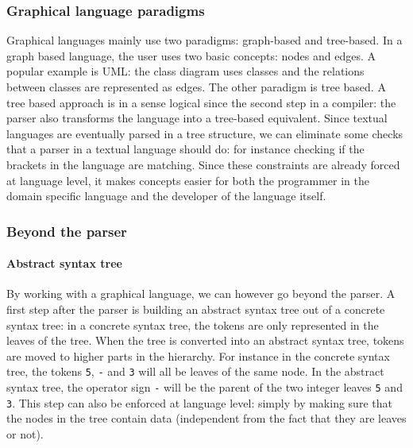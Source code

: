 \subsubsection{Graphical language paradigms}
Graphical languages mainly use two paradigms: graph-based and tree-based. In a
graph based language, the user uses two basic concepts: nodes and edges. A
popular example is UML: the class diagram uses classes and the relations
between classes are represented as edges. The other paradigm is tree based. A
tree based approach is in a sense logical since the second step in a compiler:
the parser also transforms the language into a tree-based equivalent. Since
textual languages are eventually parsed in a tree structure, we can eliminate
some checks that a parser in a textual language should do: for instance
checking if the brackets in the language are matching. Since these constraints
are already forced at language level, it makes concepts easier for both the
programmer in the domain specific language and the developer of the language
itself.
\subsubsection{Beyond the parser}
\paragraph{Abstract syntax tree}
By working with a graphical language, we can however go beyond the parser. A
first step after the parser is building an abstract syntax tree out of a
concrete syntax tree: in a concrete syntax tree, the tokens are only
represented in the leaves of the tree. When the tree is converted into an
abstract syntax tree, tokens are moved to higher parts in the hierarchy. For
instance in the concrete syntax tree, the tokens \verb+5+, \verb+-+ and
\verb+3+ will all be leaves of the same node. In the abstract syntax tree, the
operator sign \verb+-+ will be the parent of the two integer leaves \verb+5+
and \verb+3+. This step can also be enforced at language level: simply by
making sure that the nodes in the tree contain data (independent from the fact
that they are leaves or not).
